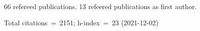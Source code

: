 66 refereed publications. 13 refeered publications as first author.

Total citations~=~2151; h-index~=~23 (2021-12-02)